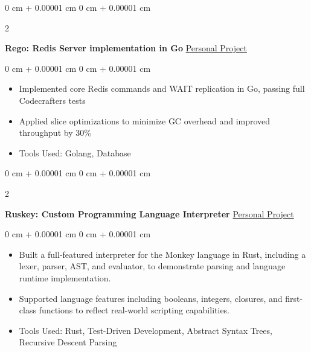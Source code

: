 \documentclass[10pt, letterpaper]{article}
\newenvironment{highlights}{
    \begin{itemize}[
        topsep=0.10 cm,
        parsep=0.10 cm,
        partopsep=0pt,
        itemsep=0pt,
        leftmargin=0 cm + 10pt
    ]
}{
    \end{itemize}
} %
\newenvironment{onecolentry}{
    \begin{adjustwidth}{
        0 cm + 0.00001 cm
    }{
        0 cm + 0.00001 cm
    }
}{
    \end{adjustwidth}
} %
\newenvironment{twocolentry}[2][]{
    \onecolentry
    \def\secondColumn{#2}
    \setcolumnwidth{\fill, 4.5 cm}
    \begin{paracol}{2}
}{
    \switchcolumn \raggedleft \secondColumn
    \end{paracol}
    \endonecolentry
} %
\begin{document}
        \vspace{0.2 cm} 
        
        \begin{twocolentry}{
            \href{https://github.com/yuann3/Rego/}{Personal Project}
        }
            \textbf{Rego: Redis Server implementation in Go}\end{twocolentry}

        \vspace{0.10 cm}
        \begin{onecolentry}
            \begin{highlights}
                \item Implemented core Redis commands and WAIT replication in Go, passing full Codecrafters tests
                \item Applied slice optimizations to minimize GC overhead and improved throughput by 30\%
                \item Tools Used: Golang, Database
            \end{highlights}
        \end{onecolentry}

        \vspace{0.2 cm} 
        
        \begin{twocolentry}{
            \href{https://github.com/yuann3/Ruskey/}{Personal Project}
        }
            \textbf{Ruskey: Custom Programming Language Interpreter}\end{twocolentry}

        \vspace{0.10 cm}
        \begin{onecolentry}
            \begin{highlights}
                \item Built a full-featured interpreter for the Monkey language in Rust, including a lexer, parser, AST, and evaluator, to demonstrate parsing and language runtime implementation.    
                \item Supported language features including booleans, integers, closures, and first-class functions to reflect real-world scripting capabilities.
                \item Tools Used: Rust, Test-Driven Development, Abstract Syntax Trees, Recursive Descent Parsing
            \end{highlights}
        \end{onecolentry}
        
\end{document}
